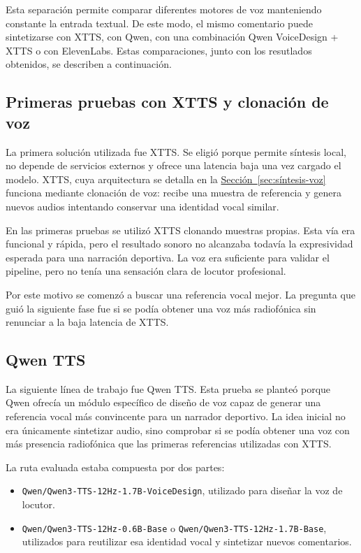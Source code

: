 Esta separación permite comparar diferentes motores de voz manteniendo constante la entrada textual. De este modo, el mismo comentario puede sintetizarse con XTTS, con Qwen, con una combinación Qwen VoiceDesign + XTTS o con ElevenLabs. Estas comparaciones, junto con los resutlados obtenidos, se describen a continuación.

\subsection{Primeras pruebas con XTTS y clonación de voz}

La primera solución utilizada fue XTTS. Se eligió porque permite síntesis local, no depende de servicios externos y ofrece una latencia baja una vez cargado el modelo. XTTS, cuya arquitectura se detalla en la \hyperref[sec:síntesis-voz]{Sección~\ref*{sec:síntesis-voz}} funciona mediante clonación de voz: recibe una muestra de referencia y genera nuevos audios intentando conservar una identidad vocal similar.

En las primeras pruebas se utilizó XTTS clonando muestras propias. Esta vía era funcional y rápida, pero el resultado sonoro no alcanzaba todavía la expresividad esperada para una narración deportiva. La voz era suficiente para validar el pipeline, pero no tenía una sensación clara de locutor profesional.

Por este motivo se comenzó a buscar una referencia vocal mejor. La pregunta que guió la siguiente fase fue si se podía obtener una voz más radiofónica sin renunciar a la baja latencia de XTTS.

\subsection{Qwen TTS}

La siguiente línea de trabajo fue Qwen TTS. Esta prueba se planteó porque Qwen ofrecía un módulo específico de diseño de voz capaz de generar una referencia vocal más convincente para un narrador deportivo. La idea inicial no era únicamente sintetizar audio, sino comprobar si se podía obtener una voz con más presencia radiofónica que las primeras referencias utilizadas con XTTS.

La ruta evaluada estaba compuesta por dos partes:

\begin{itemize}
    \item \texttt{Qwen/Qwen3-TTS-12Hz-1.7B-VoiceDesign}, utilizado para diseñar la voz de locutor.
    \item \texttt{Qwen/Qwen3-TTS-12Hz-0.6B-Base} o \texttt{Qwen/Qwen3-TTS-12Hz-1.7B-Base}, utilizados para reutilizar esa identidad vocal y sintetizar nuevos comentarios.
\end{itemize}

